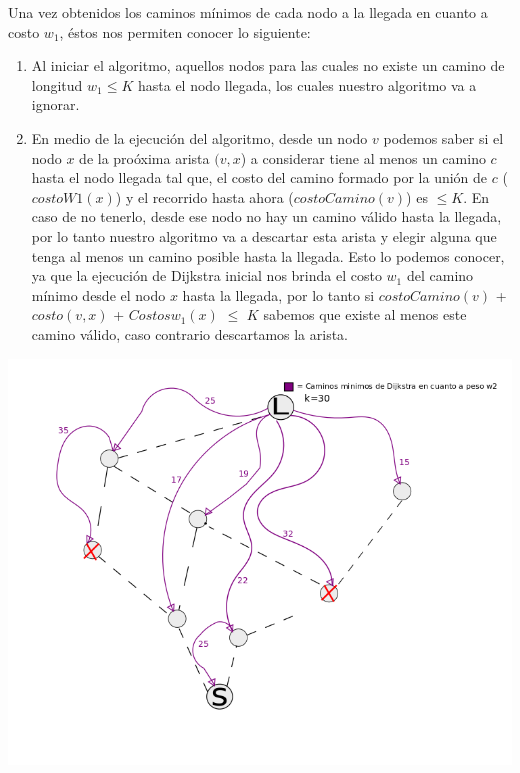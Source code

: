 \vspace{2mm}

Una vez obtenidos los caminos m\'inimos de cada nodo a la llegada en cuanto a costo $w_1$, \'estos nos permiten conocer lo siguiente:

\begin{enumerate}
\item Al iniciar el algoritmo, aquellos nodos para las cuales no existe un camino de longitud $w_1 \leq K$ hasta el nodo llegada, los cuales nuestro algoritmo va a ignorar.
\item En medio de la ejecuci\'on del algoritmo, desde un nodo $v$ podemos saber si el nodo $x$ de la pro\'oxima arista $(v,x$) a considerar tiene al menos un camino $c$ hasta el nodo llegada tal que, el costo del camino formado por la uni\'on de $c$ ($costoW1(x)$) y el recorrido hasta ahora ($costoCamino(v)$) es $\leq K$. En caso de no tenerlo, desde ese nodo no hay un camino v\'alido hasta la llegada, por lo tanto nuestro algoritmo va a descartar esta arista y elegir alguna que tenga al menos un camino posible hasta la llegada. Esto lo podemos conocer, ya que la ejecuci\'on de Dijkstra inicial nos brinda el costo $w_1$ del camino m\'inimo desde el nodo $x$ hasta la llegada, por lo tanto  si $costoCamino(v)$ + $costo(v,x)$ + $Costosw_1(x)$ $\leq$ $K$ sabemos que existe al menos este camino v\'alido, caso contrario descartamos la arista.
\end{enumerate}



\begin{center}
\includegraphics[scale=0.58]{img/inicializacion.png}
\end{center}	
\vspace{2mm}

